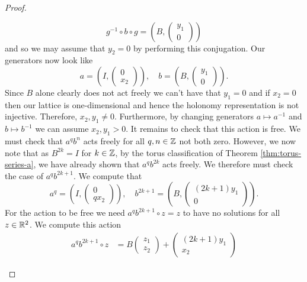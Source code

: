 \begin{proof}
\begin{case}[$A=I$, $B=B_1$]
        $$
            g^{-1}\circ b \circ g = \left(B, \begin{pmatrix}
                    y_1 \\ 0
                \end{pmatrix}\right)
        $$
        and so we may assume that $y_2 =0$ by performing this conjugation. Our generators now look like
        $$a = \left(I, \begin{pmatrix}
                    0 \\ x_2
                \end{pmatrix}\right), \quad b = \left(B, \begin{pmatrix}
                    y_1 \\ 0
                \end{pmatrix}\right).$$
        Since $B$ alone clearly does not act freely we can't have that $y_1 =0$ and if $x_2=0$ then our lattice is one-dimensional and hence the holonomy representation is not injective.
        Therefore, $x_2, y_1 \neq 0$. Furthermore, by changing generators $a \mapsto a^{-1}$ and $b \mapsto b^{-1}$ we can assume $x_2, y_1 >0$. It remains to check that this action is free.
        We must check that $a^qb^n$ acts freely for all $q,n \in \mathbb{Z}$ not both zero. However, we now note that as $B^{2k} = I$ for $k\in \mathbb{Z}$, by the torus classification of Theorem \ref{thm:torus-series-a},
        we have already shown that $a^qb^{2k}$ acts freely. We therefore must check the case of $a^qb^{2k+1}$. We compute that
        $$
            a^q = \left(I, \begin{pmatrix}
                    0 \\ qx_2
                \end{pmatrix} \right)
            , \quad b^{2k+1} = \left(B, \begin{pmatrix}
                    (2k+1)y_1 \\ 0
                \end{pmatrix} \right).$$
        For the action to be free we need $a^qb^{2k+1}\circ z = z$ to have no solutions for all $z \in \mathbb{R}^2$. We compute this action
        \begin{align*}
            a^qb^{2k+1}\circ z & = B \begin{pmatrix}
                                         z_1 \\ z_2
                                     \end{pmatrix} + \begin{pmatrix}
                                                         (2k+1)y_1 \\ x_2

\end{pmatrix}
\end{align*}
\end{case}
\end{proof}
